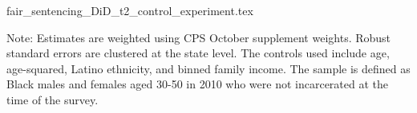 {fair_sentencing_DiD_t2_control_experiment.tex}
\begin{footnotesize}
  \noindent Note: Estimates are weighted using CPS October supplement weights. Robust standard errors are clustered at the state level. The controls used include age, age-squared, Latino ethnicity, and binned family income. The sample is defined as Black males and females aged 30-50 in 2010 who were not incarcerated at the time of the survey.
\end{footnotesize}
\clearpage


